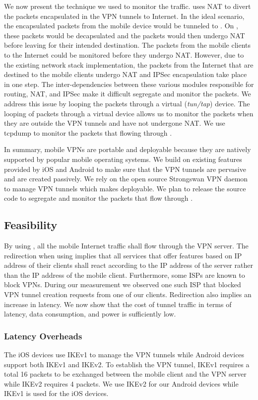 We now present the technique we used to monitor the traffic. 
\platname uses NAT to divert the packets encapsulated in the VPN tunnels to Internet. 
In the ideal scenario, the encapsulated packets from the mobile device would be tunneled to \platname. 
On \platname, these packets would be decapsulated and the packets would then undergo NAT before leaving for their intended destination. 
The packets from the mobile clients to the Internet could be monitored before they undergo NAT.
However, due to the existing network stack implementation, the packets from the Internet that are destined to the mobile clients undergo NAT and IPSec encapsulation take place in one step.
The inter-dependencies between these various modules responsible for routing, NAT, and IPSec make it difficult segregate and monitor the packets. 
We address this issue by looping the packets through a virtual (\emph{tun/tap}) device. 
The looping of packets through a virtual device allows us to monitor the packets when they are outside the VPN tunnels and have not undergone NAT. 
We use tcpdump to monitor the packets that flowing through \platname. 

In summary, mobile VPNs are portable and deployable because they are natively supported by popular mobile operating systems.
We build on existing features provided by iOS and Android to make sure that the VPN tunnels are pervasive and are created passively. 
We rely on the open source Strongswan VPN daemon to manage VPN tunnels which makes \platname deployable.
We plan to release the source code to segregate and monitor the packets that flow through \platname.

\subsection{Feasibility}

By using \platname, all the mobile Internet traffic shall flow through the VPN server. 
The redirection when using \platname implies that all services that offer features based on IP address of their clients shall react according to the IP address of the server rather than the IP address of the mobile client.
Furthermore, some ISPs are known to block VPNs. 
During our measurement we observed one such ISP that blocked VPN tunnel creation requests from one of our clients.
Redirection also implies an increase in latency.  
We now show that the cost of tunnel traffic in terms of latency, data consumption, and power is sufficiently low.

\subsubsection{Latency Overheads}
The iOS devices use IKEv1 to manage the VPN tunnels while Android devices support both IKEv1 and IKEv2. 
To establish the VPN tunnel, IKEv1 requires a total 16 packets to be exchanged between the mobile client and the VPN server while IKEv2 requires 4 packets.
We use IKEv2 for our Android devices while IKEv1 is used for the iOS devices. 

